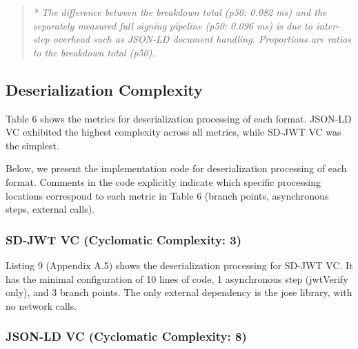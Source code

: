 \documentclass[conference]{IEEEtran}
\begin{document}
\begin{quote}
\emph{* The difference between the breakdown total (p50: 0.082 ms) and the separately measured full signing pipeline (p50: 0.096 ms) is due to inter-step overhead such as JSON-LD document handling. Proportions are ratios to the breakdown total (p50).}
\end{quote}

\subsection{Deserialization Complexity}

Table 6 shows the metrics for deserialization processing of each format. JSON-LD VC exhibited the highest complexity across all metrics, while SD-JWT VC was the simplest.


\begin{table}[!t]
\centering
\caption{Table 6. Deserialization and Verification Implementation Complexity Comparison}\label{tab:6}
\footnotesize
{}
\end{table}

Below, we present the implementation code for deserialization processing of each format. Comments in the code explicitly indicate which specific processing locations correspond to each metric in Table 6 (branch points, asynchronous steps, external calls).

\subsubsection{SD-JWT VC (Cyclomatic Complexity: 3)}

Listing 9 (Appendix A.5) shows the deserialization processing for SD-JWT VC. It has the minimal configuration of 10 lines of code, 1 asynchronous step (jwtVerify only), and 3 branch points. The only external dependency is the jose library, with no network calls.

\subsubsection{JSON-LD VC (Cyclomatic Complexity: 8)}
\end{document}
